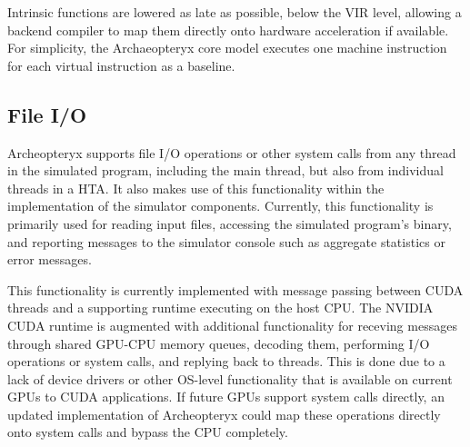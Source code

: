 \documentclass[conference, 10pt]{IEEEtran}
\begin{document}
Intrinsic functions are lowered as late as possible, below the
VIR level, allowing a backend compiler to map them directly onto hardware
acceleration if available.  For simplicity, the Archaeopteryx core model
executes one machine instruction for each virtual instruction as a baseline.

%
%

\subsection{File I/O}
Archeopteryx supports file I/O operations or other system calls from any thread
in the simulated program, including the main thread, but also from individual
threads in a HTA.  It also makes use of this functionality within the
implementation of the simulator components. Currently, this functionality is
primarily used for reading input files, accessing the simulated program's
binary, and reporting messages to the simulator console such as aggregate
statistics or error messages. 

This functionality is currently implemented with message passing between
CUDA threads and a supporting runtime executing on the host CPU.  The NVIDIA
CUDA runtime is augmented with additional functionality for receving messages
through shared GPU-CPU memory queues, decoding them, performing I/O operations
or system calls, and replying back to threads.  This is done due to a lack of
device drivers or other OS-level functionality that is available on current GPUs
to CUDA applications. If future GPUs support system calls directly, an updated
implementation of Archeopteryx could map these operations directly onto system
calls and bypass the CPU completely.



\end{document}
